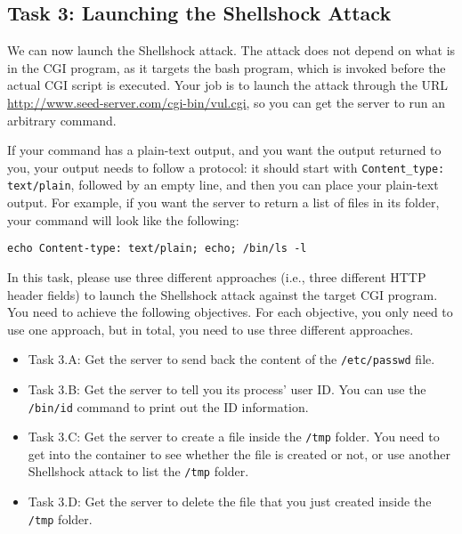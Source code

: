 \subsection{Task 3: Launching the Shellshock Attack}

We can now launch the Shellshock attack. 
The attack does not depend on what is in the CGI program, as it targets
the bash program, which is invoked before the actual CGI script is
executed. Your job is to launch the attack through the URL
\url{http://www.seed-server.com/cgi-bin/vul.cgi}, so you can
get the server to run an arbitrary command. 


If your command has a plain-text output, and you want the output returned to you,
your output needs to follow a protocol: it should start with 
\texttt{Content\_type: text/plain}, followed by an empty line, and then
you can place your plain-text output. For example, if you want the
server to return a list of files in its folder, your command  
will look like the following: 

\begin{lstlisting}
echo Content-type: text/plain; echo; /bin/ls -l
\end{lstlisting}
 

In this task, please use three different approaches (i.e., three different HTTP header fields)
to launch the Shellshock attack against the target CGI program. You need to achieve 
the following objectives. For each objective, you only need to use one approach,
but in total, you need to use three different approaches. 

\begin{itemize}
\item Task 3.A: Get the server to send back the content of the \texttt{/etc/passwd} file. 

\item Task 3.B: Get the server to tell you its process' user ID. You can use 
the \texttt{/bin/id} command to print out the ID information. 

\item Task 3.C: Get the server to create a file inside the \texttt{/tmp} folder. You need to 
get into the container to see whether the file is created or not, or use 
another Shellshock attack to list the \texttt{/tmp} folder.

\item Task 3.D: Get the server to delete the file that you just created 
inside the \texttt{/tmp} folder. 
\end{itemize} 


